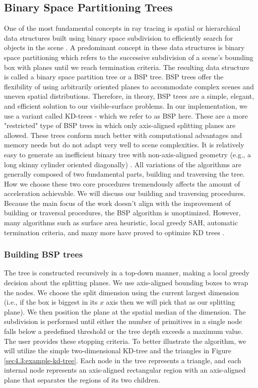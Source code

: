 \documentclass[a4paper,11pt,oneside]{article}
\begin{document}
\subsection{Binary Space Partitioning Trees}
\label{section:bsp-optimization}

One of the most fundamental concepts in ray tracing is spatial or hierarchical data structures built using binary space subdivision to efficiently search for objects in the scene \cite{ray_tracing_BSP2}. A predominant concept in these data structures is binary space partitioning which refers to the successive subdivision of a scene's bounding box with planes until we reach termination criteria. The resulting data structure is called a binary space partition tree or a BSP tree. BSP trees offer the flexibility of using arbitrarily oriented planes to accommodate complex scenes and uneven spatial distributions. Therefore, in theory, BSP trees are a simple, elegant, and efficient solution to our visible-surface problems. In our implementation, we use a variant called KD-trees - which we refer to as BSP here. These are a more "restricted" type of BSP trees in which only axis-aligned splitting planes are allowed. These trees conform much better with computational advantages and memory needs but do not adapt very well to scene complexities. It is relatively easy to generate an inefficient binary tree with non-axis-aligned geometry (e.g., a long skinny cylinder oriented diagonally) \cite{ray_tracing_BSP}. All variations of the algorithms are generally composed of two fundamental parts, building and traversing the tree. How we choose these two core procedures tremendously affects the amount of acceleration achievable. We will discuss our building and traversing procedures. Because the main focus of the work doesn't align with the improvement of building or traversal procedures, the BSP algorithm is unoptimized. However, many algorithms such as surface area heuristic, local greedy SAH, automatic termination criteria, and many more have proved to optimize KD trees \cite{fast_building_kd_trees, parallel_kd_tree_construction}.

\subsubsection{Building BSP trees}

The tree is constructed recursively in a top-down manner, making a local greedy decision about the splitting planes. We use axis-aligned bounding boxes to wrap the nodes. We choose the split dimension using the current largest dimension (i.e., if the box is biggest in its $x$ axis then we will pick that as our splitting plane). We then position the plane at the spatial median of the dimension. The subdivision is performed until either the number of primitives in a single node falls below a predefined threshold or the tree depth exceeds a maximum value.  The user provides these stopping criteria. To better illustrate the algorithm, we will utilize the simple two-dimensional KD-tree and the triangles in Figure \ref{sec4.3:example-kd-tree}. Each node in the tree represents a triangle, and each internal node represents an axis-aligned rectangular region with an axis-aligned plane that separates the regions of its two children.
\end{document}

